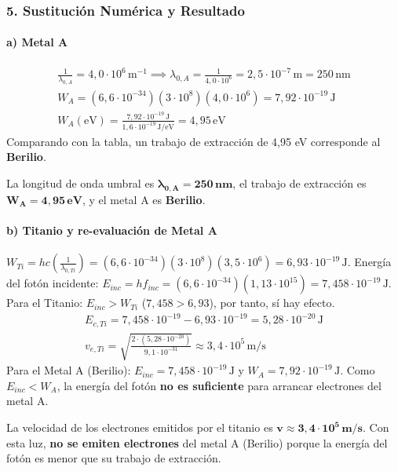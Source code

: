 \subsubsection*{5. Sustitución Numérica y Resultado}
\paragraph*{a) Metal A}
\begin{gather}
    \frac{1}{\lambda_{0,A}} = 4,0 \cdot 10^6 \, \text{m}^{-1} \implies \lambda_{0,A} = \frac{1}{4,0 \cdot 10^6} = 2,5 \cdot 10^{-7} \, \text{m} = 250 \, \text{nm} \\
    W_A = (6,6\cdot10^{-34})(3\cdot10^8)(4,0\cdot10^6) = 7,92 \cdot 10^{-19} \, \text{J} \\
    W_A (\text{eV}) = \frac{7,92 \cdot 10^{-19} \, \text{J}}{1,6 \cdot 10^{-19} \, \text{J/eV}} = 4,95 \, \text{eV}
\end{gather}
Comparando con la tabla, un trabajo de extracción de 4,95 eV corresponde al \textbf{Berilio}.
\begin{cajaresultado}
    La longitud de onda umbral es $\boldsymbol{\lambda_{0,A} = 250 \, nm}$, el trabajo de extracción es $\boldsymbol{W_A = 4,95 \, eV}$, y el metal A es \textbf{Berilio}.
\end{cajaresultado}

\paragraph*{b) Titanio y re-evaluación de Metal A}
$W_{Ti} = hc \left(\frac{1}{\lambda_{0,Ti}}\right) = (6,6\cdot10^{-34})(3\cdot10^8)(3,5\cdot10^6) = 6,93 \cdot 10^{-19} \, \text{J}$.
Energía del fotón incidente: $E_{inc} = h f_{inc} = (6,6\cdot10^{-34})(1,13\cdot10^{15}) = 7,458 \cdot 10^{-19} \, \text{J}$.
Para el Titanio: $E_{inc} > W_{Ti}$ ($7,458 > 6,93$), por tanto, sí hay efecto.
\begin{gather}
    E_{c,Ti} = 7,458 \cdot 10^{-19} - 6,93 \cdot 10^{-19} = 5,28 \cdot 10^{-20} \, \text{J} \\
    v_{e,Ti} = \sqrt{\frac{2 \cdot (5,28 \cdot 10^{-20})}{9,1\cdot10^{-31}}} \approx 3,4 \cdot 10^5 \, \text{m/s}
\end{gather}
Para el Metal A (Berilio): $E_{inc} = 7,458 \cdot 10^{-19} \, \text{J}$ y $W_A = 7,92 \cdot 10^{-19} \, \text{J}$.
Como $E_{inc} < W_A$, la energía del fotón \textbf{no es suficiente} para arrancar electrones del metal A.
\begin{cajaresultado}
    La velocidad de los electrones emitidos por el titanio es $\boldsymbol{v \approx 3,4 \cdot 10^5 \, m/s}$. Con esta luz, \textbf{no se emiten electrones} del metal A (Berilio) porque la energía del fotón es menor que su trabajo de extracción.
\end{cajaresultado}

